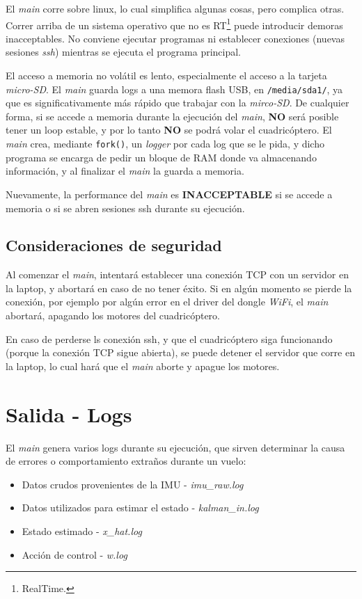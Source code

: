 \documentclass[main]{subfiles}
\begin{document}
El \textit{main} corre sobre linux, lo cual simplifica algunas cosas, pero complica otras. Correr arriba de un sistema operativo que no es RT\footnote{RealTime.} puede introducir demoras inacceptables. No conviene ejecutar programas ni establecer conexiones (nuevas sesiones \textit{ssh}) mientras se ejecuta el programa principal.

El acceso a memoria no volátil es lento, especialmente el acceso a la tarjeta \textit{micro-SD}. El \textit{main} guarda logs a una memora flash USB, en \verb+/media/sda1/+, ya que es significativamente más rápido que trabajar con la \textit{mirco-SD}. De cualquier forma, si se accede a memoria durante la ejecución del \textit{main}, \textbf{NO} será posible tener un loop estable, y por lo tanto \textbf{NO} se podrá volar el cuadricóptero. El \textit{main} crea, mediante \verb+fork()+, un \textit{logger} por cada log que se le pida, y dicho programa se encarga de pedir un bloque de RAM donde va almacenando información, y al finalizar el \textit{main} la guarda a memoria.

Nuevamente, la performance del \textit{main} es \textbf{INACCEPTABLE} si se accede a memoria o si se abren sesiones ssh durante su ejecución.

\subsection{Consideraciones de seguridad}
\label{sec:codigo:consideraciones-de-seguridad}

Al comenzar el \textit{main}, intentará establecer una conexión TCP con un servidor en la laptop, y abortará en caso de no tener éxito. Si en algún momento se pierde la conexión, por ejemplo por algún error en el driver del dongle \textit{WiFi}, el \textit{main} abortará, apagando los motores del cuadricóptero.

En caso de perderse ls conexión ssh, y que el cuadricóptero siga funcionando (porque la conexión TCP sigue abierta), se puede detener el servidor que corre en la laptop, lo cual hará que el \textit{main} aborte y apague los motores.

\section{Salida - Logs}
\label{salidas-logs}

El \textit{main} genera varios logs durante su ejecución, que sirven determinar la causa de errores o comportamiento extraños durante un vuelo:
\begin{itemize}
\item Datos crudos provenientes de la IMU - \textit{imu\_raw.log}
\item Datos utilizados para estimar el estado - \textit{kalman\_in.log}
\item Estado estimado - \textit{x\_hat.log}
\item Acción de control - \textit{w.log}
\end{itemize}
\end{document}

